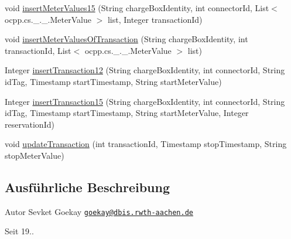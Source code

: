 \begin{DoxyCompactItemize}
\item 
void \hyperlink{interfacede_1_1rwth_1_1idsg_1_1steve_1_1repository_1_1_ocpp_server_repository_abe132ff15dbaaa31a5838eeb110c6520}{insert\-Meter\-Values15} (String charge\-Box\-Identity, int connector\-Id, List$<$ ocpp.\-cs.\-\_.\-\_.\-Meter\-Value $>$ list, Integer transaction\-Id)
\item 
void \hyperlink{interfacede_1_1rwth_1_1idsg_1_1steve_1_1repository_1_1_ocpp_server_repository_add54f5d6c360d37f96b319430fa094e6}{insert\-Meter\-Values\-Of\-Transaction} (String charge\-Box\-Identity, int transaction\-Id, List$<$ ocpp.\-cs.\-\_.\-\_.\-Meter\-Value $>$ list)
\item 
Integer \hyperlink{interfacede_1_1rwth_1_1idsg_1_1steve_1_1repository_1_1_ocpp_server_repository_ab5cae0186fdeef7ce8a490bca552963e}{insert\-Transaction12} (String charge\-Box\-Identity, int connector\-Id, String id\-Tag, Timestamp start\-Timestamp, String start\-Meter\-Value)
\item 
Integer \hyperlink{interfacede_1_1rwth_1_1idsg_1_1steve_1_1repository_1_1_ocpp_server_repository_aaa63b9ae3a0252107a34aa923991baa6}{insert\-Transaction15} (String charge\-Box\-Identity, int connector\-Id, String id\-Tag, Timestamp start\-Timestamp, String start\-Meter\-Value, Integer reservation\-Id)
\item 
void \hyperlink{interfacede_1_1rwth_1_1idsg_1_1steve_1_1repository_1_1_ocpp_server_repository_a251abdd153c42cb6e45eaf00b0168f92}{update\-Transaction} (int transaction\-Id, Timestamp stop\-Timestamp, String stop\-Meter\-Value)
\end{DoxyCompactItemize}


\subsection{Ausführliche Beschreibung}
\begin{DoxyAuthor}{Autor}
Sevket Goekay \href{mailto:goekay@dbis.rwth-aachen.de}{\tt goekay@dbis.\-rwth-\/aachen.\-de} 
\end{DoxyAuthor}
\begin{DoxySince}{Seit}
19.. 
\end{DoxySince}


